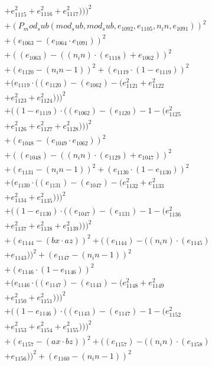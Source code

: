 \documentclass[10pt, a4paper]{article}
\begin{document}
\begin{small}
\begin{align*}
& + e_{1115}^{2} + e_{1116}^{2} + e_{1117}^{2})))^{2} \\
& + (P_mod_sub(mod_sub, mod_sub, e_{1092}, e_{1105}, n_in, e_{1091}))^{2} \\
& + (e_{1063} - (e_{1064}  \cdot  e_{1091}))^{2} \\
& + ((e_{1063}) - ((n_in)  \cdot  (e_{1118}) + e_{1062}))^{2} \\
& + (e_{1120} - (n_in - 1))^{2} + (e_{1119}  \cdot  (1 - e_{1119}))^{2} \\
& + (e_{1119}  \cdot  ((e_{1120}) - (e_{1062}) - (e_{1121}^{2} + e_{1122}^{2} \\
& + e_{1123}^{2} + e_{1124}^{2})))^{2} \\
& + ((1 - e_{1119})  \cdot  ((e_{1062}) - (e_{1120}) - 1 - (e_{1125}^{2} \\
& + e_{1126}^{2} + e_{1127}^{2} + e_{1128}^{2})))^{2} \\
& + (e_{1048} - (e_{1049}  \cdot  e_{1062}))^{2} \\
& + ((e_{1048}) - ((n_in)  \cdot  (e_{1129}) + e_{1047}))^{2} \\
& + (e_{1131} - (n_in - 1))^{2} + (e_{1130}  \cdot  (1 - e_{1130}))^{2} \\
& + (e_{1130}  \cdot  ((e_{1131}) - (e_{1047}) - (e_{1132}^{2} + e_{1133}^{2} \\
& + e_{1134}^{2} + e_{1135}^{2})))^{2} \\
& + ((1 - e_{1130})  \cdot  ((e_{1047}) - (e_{1131}) - 1 - (e_{1136}^{2} \\
& + e_{1137}^{2} + e_{1138}^{2} + e_{1139}^{2})))^{2} \\
& + (e_{1144} - (bx  \cdot  az))^{2} + ((e_{1144}) - ((n_in)  \cdot  (e_{1145}) \\
& + e_{1143}))^{2} + (e_{1147} - (n_in - 1))^{2} \\
& + (e_{1146}  \cdot  (1 - e_{1146}))^{2} \\
& + (e_{1146}  \cdot  ((e_{1147}) - (e_{1143}) - (e_{1148}^{2} + e_{1149}^{2} \\
& + e_{1150}^{2} + e_{1151}^{2})))^{2} \\
& + ((1 - e_{1146})  \cdot  ((e_{1143}) - (e_{1147}) - 1 - (e_{1152}^{2} \\
& + e_{1153}^{2} + e_{1154}^{2} + e_{1155}^{2})))^{2} \\
& + (e_{1157} - (ax  \cdot  bz))^{2} + ((e_{1157}) - ((n_in)  \cdot  (e_{1158}) \\
& + e_{1156}))^{2} + (e_{1160} - (n_in - 1))^{2} \\

\end{align*}
\end{small}
\end{document}
